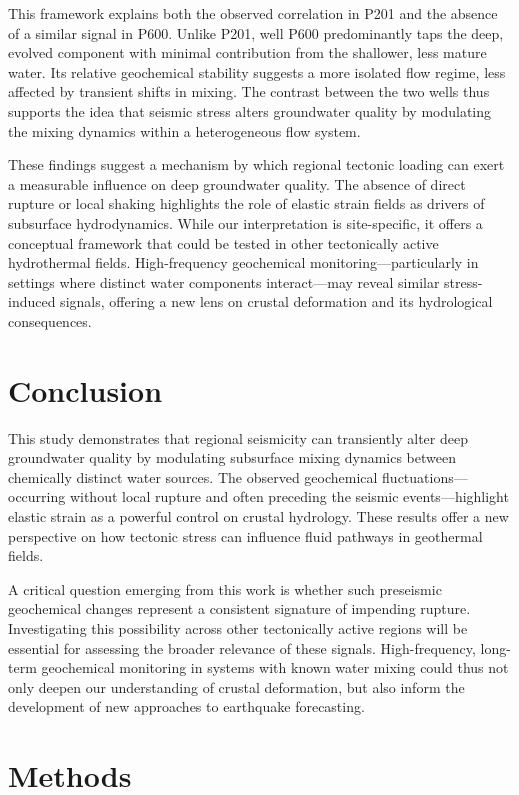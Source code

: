 This framework explains both the observed correlation in P201 and the absence of a similar signal in P600.
Unlike P201, well P600 predominantly taps the deep, evolved component with minimal contribution from the shallower, less mature water.
Its relative geochemical stability suggests a more isolated flow regime, less affected by transient shifts in mixing.
The contrast between the two wells thus supports the idea that seismic stress alters groundwater quality by modulating the mixing dynamics within a heterogeneous flow system.

These findings suggest a mechanism by which regional tectonic loading can exert a measurable influence on deep groundwater quality.
The absence of direct rupture or local shaking highlights the role of elastic strain fields as drivers of subsurface hydrodynamics.
While our interpretation is site-specific, it offers a conceptual framework that could be tested in other tectonically active hydrothermal fields.
High-frequency geochemical monitoring---particularly in settings where distinct water components interact---may reveal similar stress-induced signals, offering a new lens on crustal deformation and its hydrological consequences.

\section{Conclusion}
This study demonstrates that regional seismicity can transiently alter deep groundwater quality by modulating subsurface mixing dynamics between chemically distinct water sources.
The observed geochemical fluctuations---occurring without local rupture and often preceding the seismic events---highlight elastic strain as a powerful control on crustal hydrology.
These results offer a new perspective on how tectonic stress can influence fluid pathways in geothermal fields.

A critical question emerging from this work is whether such preseismic geochemical changes represent a consistent signature of impending rupture.
Investigating this possibility across other tectonically active regions will be essential for assessing the broader relevance of these signals.
High-frequency, long-term geochemical monitoring in systems with known water mixing could thus not only deepen our understanding of crustal deformation, but also inform the development of new approaches to earthquake forecasting.

\section{Methods}
